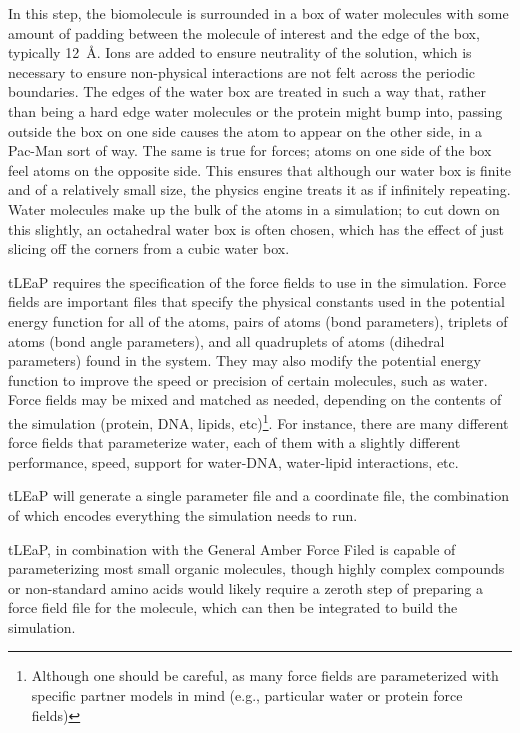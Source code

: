 In this step, the biomolecule is surrounded in a box of water molecules with some amount of padding between the molecule of interest and the edge of the box, typically \qty{12}{\angstrom}. Ions are added to ensure neutrality of the solution, which is necessary to ensure non-physical interactions are not felt across the periodic boundaries. The edges of the water box are treated in such a way that, rather than being a hard edge water molecules or the protein might bump into, passing outside the box on one side causes the atom to appear on the other side, in a Pac-Man sort of way. The same is true for forces; atoms on one side of the box feel atoms on the opposite side. This ensures that although our water box is finite and of a relatively small size, the physics engine treats it as if infinitely repeating. Water molecules make up the bulk of the atoms in a simulation; to cut down on this slightly, an octahedral water box is often chosen, which has the effect of just slicing off the corners from a cubic water box.

tLEaP requires the specification of the force fields to use in the simulation. Force fields are important files that specify the physical constants used in the potential energy function for all of the atoms, pairs of atoms (bond parameters), triplets of atoms (bond angle parameters), and all quadruplets of atoms (dihedral parameters) found in the system. They may also modify the potential energy function to improve the speed or precision of certain molecules, such as water. Force fields may be mixed and matched as needed, depending on the contents of the simulation (protein, DNA, lipids, etc)\footnote{Although one should be careful, as many force fields are parameterized with specific partner models in mind (e.g., particular water or protein force fields)}. For instance, there are many different force fields that parameterize water, each of them with a slightly different performance, speed, support for water-DNA, water-lipid interactions, etc.

tLEaP will generate a single parameter file and a coordinate file, the combination of which encodes everything the simulation needs to run.

tLEaP, in combination with the General Amber Force Filed is capable of parameterizing most small organic molecules, though highly complex compounds or non-standard amino acids would likely require a zeroth step of preparing a force field file for the molecule, which can then be integrated to build the simulation.

